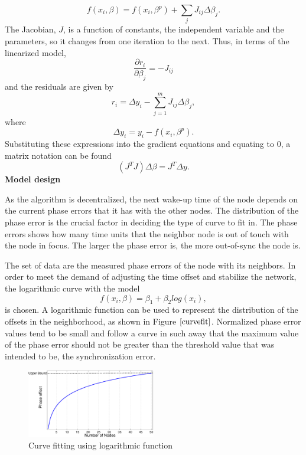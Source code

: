 \documentclass[journal]{IEEEtran}
\begin{document}
\begin{equation}
 f(x_i,\beta) =f(x_i, \beta^p)+\sum_j J_{ij} \Delta\beta_j.
\end{equation}
The Jacobian, $J$, is a function of constants, the independent
variable and the parameters, so it changes from one iteration to the
next. Thus, in terms of the linearized model,
\begin{equation}
\frac{\partial r_i}{\partial \beta_j}=-J_{ij}
\end{equation}
and the residuals are given by
\begin{equation}
    r_i=\Delta y_i- \sum_{j=1}^{m} J_{ij}\Delta\beta_j,
\end{equation}
where
\begin{equation}
 \Delta y_i=y_i- f(x_i, \beta^p).
\end{equation}
Substituting these expressions into the gradient equations and
equating to $0$, a matrix notation can be found
\begin{equation}
    \left(J^TJ\right)\Delta  \beta=J^T\Delta y.
\end{equation}
\textbf{Model design} \par
As the algorithm is decentralized, the next wake-up time of the node depends on
the current phase errors that it has with the other nodes. The distribution of the phase error is the crucial factor in deciding the type of curve to fit in. The phase errors shows how many time units that the neighbor node is out of touch with the node in focus. The larger the phase error is, the more out-of-sync the node is.\par
The set of data are the measured phase errors of the node with its neighbors.
In order to meet the demand of adjusting the time offset and stabilize the network, the logarithmic curve with the model
\begin{equation}
 f(x_i,\beta)= \beta _1 + \beta_2log(x_i),
\end{equation}
is chosen. A logarithmic function can be used to represent the distribution of the offsets in the neighborhood, as shown in Figure $\ref{curvefit}$.
Normalized phase error values tend to be small and follow a curve in such away that the maximum value of the phase error should not be greater than the threshold value that was intended to be, the synchronization error.
\begin{figure}
\centering
\includegraphics[width=0.5\textwidth]{curvefit}
\caption{Curve fitting using logarithmic function} \label{curvefit}
\end{figure}
\end{document}
